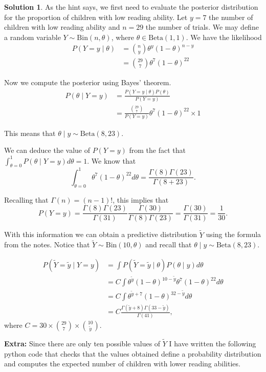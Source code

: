 \documentclass{article}
\theoremstyle{plain}
\theoremstyle{definition}
\newtheorem*{sol*}{Solution}
\begin{document}
\begin{sol*}
As the hint says, we first need to evaluate the posterior distribution for the proportion of children  with low  reading ability. Let $y=7$ the number of children with low reading ability and $n=29$ the number of trials. We may define a random variable $Y\sim \mathrm{Bin}(n,\theta)$, where $\theta\in\mathrm{Beta}(1,1)$. We have the likelihood 
\begin{align*}
P(Y=y\mid \theta) &= \binom{n}{y}\theta^y (1-\theta)^{n-y}\\
&= \binom{29}{7}\theta^7(1-\theta)^{22}
\end{align*}

Now  we compute the posterior using Bayes' theorem.
\begin{align*}
P(\theta\mid Y=y)&=\frac{P(Y=y\mid\theta)P(\theta)}{P(Y=y)}\\
&=\frac{\binom{29}{7}}{P(Y=y)}\theta^7(1-\theta)^{22}\times 1
\end{align*}


This means that $\theta\mid y\sim \mathrm{Beta}(8,23)$.

We can deduce the value of $P(Y=y)$ from the fact that $\int_{\theta=0}^1P(\theta\mid Y=y)d\theta = 1$. We know that 
\[
\int_{\theta=0}^1\theta^7(1-\theta)^{22}d\theta = \frac{\Gamma(8)\Gamma(23)}{\Gamma(8 + 23)}.
\]

Recalling that $\Gamma(n)=(n-1)!$, this implies that
\[P(Y=y) =  \frac{\Gamma(8)\Gamma(23)}{\Gamma(31)}\frac{\Gamma(30)}{\Gamma(8)\Gamma(23)}=\frac{\Gamma(30)}{\Gamma(31)}=\frac{1}{30}.\]

With this information we can obtain a predictive distribution $\tilde{Y}$ using the formula from the notes. Notice that $\tilde{Y}\sim\mathrm{Bin}(10,\theta)$ and recall that $\theta\mid y\sim\mathrm{Beta}(8,23)$.

\begin{align*}
P(\tilde{Y}=\tilde{y}\mid Y = y) &= \int P(\tilde{Y}=\tilde{y}\mid \theta)P(\theta\mid y)d\theta\\
&=C\int \theta^{\tilde{y}}(1-\theta)^{10-\tilde{y}}\theta^7(1-\theta)^{22}d\theta\\
&=C\int \theta^{\tilde{y}+7}(1-\theta)^{32-\tilde{y}}d\theta\\
&= C \frac{\Gamma(\tilde{y}+8)\Gamma(33-\tilde{y})}{\Gamma(41)},
\end{align*}
where $C=30\times \binom{29}{7}\times \binom{10}{\tilde{y}}$.

\textbf{Extra:} Since there are only ten possible values of $\tilde{Y}$ I have written the following python code that checks that the values obtained define a probability distribution and computes the expected number of children with lower reading abilities.



\end{sol*}
\end{document}

